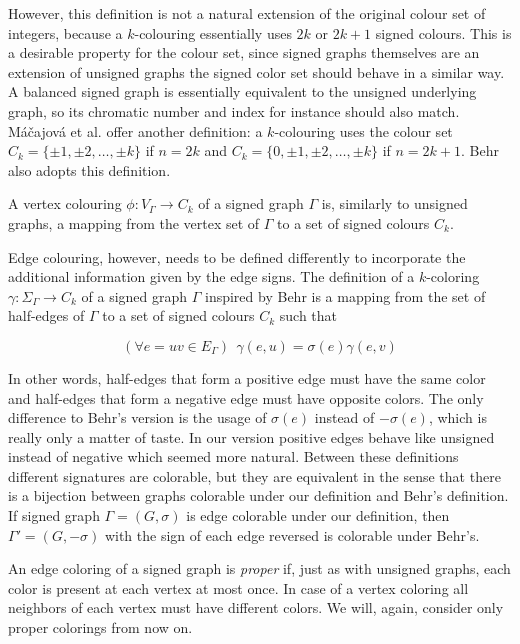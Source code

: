 However, this definition is not a natural extension of the original colour set of integers, because a $k$-colouring essentially uses $2k$ or $2k+1$ signed colours. This is a desirable property for the colour set, since signed graphs themselves are an extension of unsigned graphs the signed color set should behave in a similar way. A balanced signed graph is essentially equivalent to the unsigned underlying graph, so its chromatic number and index for instance should also match. Máčajová et al. offer another definition: a $k$-colouring uses the colour set $C_k = \{\pm 1,\pm 2,\dots,\pm k\}$ if $n = 2k$ and $C_k = \{0, \pm 1,\pm 2,\dots,\pm k\}$ if $n = 2k + 1$. Behr \cite{behr-edge-colouring} also adopts this definition.

A vertex colouring $\phi : V_{\Gamma} \rightarrow C_k$ of a signed graph $\Gamma$ is, similarly to unsigned graphs, a mapping from the vertex set of $\Gamma$ to a set of signed colours $C_k$.

Edge colouring, however, needs to be defined differently to incorporate the additional information given by the edge signs. The definition of a $k$-coloring $\gamma : \Sigma _{\Gamma} \rightarrow C_k$ of a signed graph $\Gamma$ inspired by Behr \cite{behr-edge-colouring} is a mapping from the set of half-edges of $\Gamma$ to a set of signed colours $C_k$ such that

$$(\forall e = uv \in E_{\Gamma}) ~~ \gamma(e, u) = \sigma(e)\gamma(e, v)$$

In other words, half-edges that form a positive edge must have the same color and half-edges that form a negative edge must have opposite colors. The only difference to Behr's version is the usage of $\sigma(e)$ instead of $-\sigma(e)$, which is really only a matter of taste. In our version positive edges behave like unsigned instead of negative which seemed more natural. Between these definitions different signatures are colorable, but they are equivalent in the sense that there is a bijection between graphs colorable under our definition and Behr's definition. If signed graph $\Gamma = (G, \sigma)$ is edge colorable under our definition, then $\Gamma' = (G, -\sigma)$ with the sign of each edge reversed is colorable under Behr's.

An edge coloring of a signed graph is \textit{proper} if, just as with unsigned graphs, each color is present at each vertex at most once. In case of a vertex coloring all neighbors of each vertex must have different colors. We will, again, consider only proper colorings from now on.

